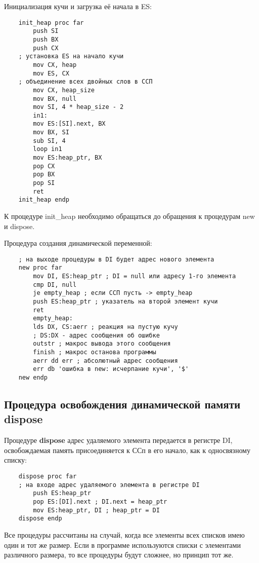 Инициализация кучи и загрузка её начала в ES:
\begin{verbatim}
    init_heap proc far
        push SI
        push BX
        push CX
    ; установка ES на начало кучи
        mov CX, heap
        mov ES, CX
    ; объединение всех двойных слов в ССП
        mov CX, heap_size
        mov BX, null
        mov SI, 4 * heap_size - 2
        in1:
        mov ES:[SI].next, BX
        mov BX, SI
        sub SI, 4
        loop in1
        mov ES:heap_ptr, BX
        pop CX
        pop BX
        pop SI
        ret
    init_heap endp
\end{verbatim}

К процедуре init_heap необходимо обращаться до обращения к процедурам new и dispose.

Процедура создания динамической переменной:
\begin{verbatim}
    ; на выходе процедуры в DI будет адрес нового элемента
    new proc far
        mov DI, ES:heap_ptr ; DI = null или адресу 1-го элемента
        cmp DI, null
        je empty_heap ; если ССП пусть -> empty_heap
        push ES:heap_ptr ; указатель на второй элемент кучи
        ret
        empty_heap:
        lds DX, CS:aerr ; реакция на пустую кучу
        ; DS:DX - адрес сообщения об ошибке
        outstr ; макрос вывода этого сообщения
        finish ; макрос останова программы
        aerr dd err ; абсолютный адрес сообщения
        err db 'ошибка в new: исчерпание кучи', '$'
    new endp
\end{verbatim}

\subsection{Процедура освобождения динамической памяти dispose}

Процедуре \textbf{dispose} адрес удаляемого элемента передается в регистре DI, освобождаемая память присоединяется к ССп в его начало, как к односвязному списку:
\begin{verbatim}
    dispose proc far
    ; на входе адрес удаляемого элемента в регистре DI
        push ES:heap_ptr
        pop ES:[DI].next ; DI.next = heap_ptr
        mov ES:heap_ptr, DI ; heap_ptr = DI
    dispose endp
\end{verbatim}

Все процедуры рассчитаны на случай, когда все элементы всех списков имею один и тот же размер. Если в программе используются списки с элементами различного размера, то все процедуры будут сложнее, но принцип тот же.

